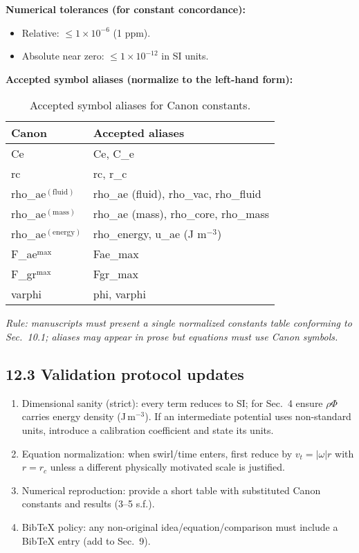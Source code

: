 \documentclass[11pt]{article}
\begin{document}
\textbf{Numerical tolerances (for constant concordance):}
\begin{itemize}
    \item Relative: $\leq 1\times 10^{-6}$ (1 ppm).
    \item Absolute near zero: $\leq 1\times 10^{-12}$ in SI units.
\end{itemize}

\textbf{Accepted symbol aliases (normalize to the left-hand form):}

\begin{table}[h!]
\centering
\begin{tabular}{|l|l|}
\hline
\textbf{Canon} & \textbf{Accepted aliases} \\
\hline
Ce & Ce, C\_e \\
rc & rc, r\_c \\
rho\_ae$^{(\text{fluid})}$ & rho\_ae (fluid), rho\_vac, rho\_fluid \\
rho\_ae$^{(\text{mass})}$ & rho\_ae (mass), rho\_core, rho\_mass \\
rho\_ae$^{(\text{energy})}$ & rho\_energy, u\_ae (J m$^{-3}$) \\
F\_ae$^{\max}$ & Fae\_max \\
F\_gr$^{\max}$ & Fgr\_max \\
varphi & phi, varphi \\
\hline
\end{tabular}
\caption{Accepted symbol aliases for Canon constants.}
\end{table}

\textit{Rule: manuscripts must present a single normalized constants table conforming to Sec.~10.1; aliases may appear in prose but equations must use Canon symbols.}

\subsection*{12.3 Validation protocol updates}

\begin{enumerate}
    \item Dimensional sanity (strict): every term reduces to SI; for Sec.~4 ensure $\rho \Phi$ carries energy density (J\,m$^{-3}$). If an intermediate potential uses non-standard units, introduce a calibration coefficient and state its units.
    \item Equation normalization: when swirl/time enters, first reduce by $v_t = |\omega| r$ with $r = r_c$ unless a different physically motivated scale is justified.
    \item Numerical reproduction: provide a short table with substituted Canon constants and results (3--5 s.f.).
    \item BibTeX policy: any non-original idea/equation/comparison must include a BibTeX entry (add to Sec.~9).
\end{enumerate}
\end{document}
